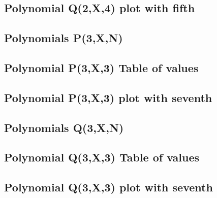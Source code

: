 \documentclass[12pt,letterpaper,oneside,reqno]{amsart}
\begin{document}
    \subsection{Polynomial Q(2,X,4) plot with fifth}
    


    \subsection{Polynomials P(3,X,N)}
    

    \subsection{Polynomial P(3,X,3) Table of values}
    

    \subsection{Polynomial P(3,X,3) plot with seventh}
    


    \subsection{Polynomials Q(3,X,N)}
    

    \subsection{Polynomial Q(3,X,3) Table of values}
    

    \subsection{Polynomial Q(3,X,3) plot with seventh}
    
\end{document}
